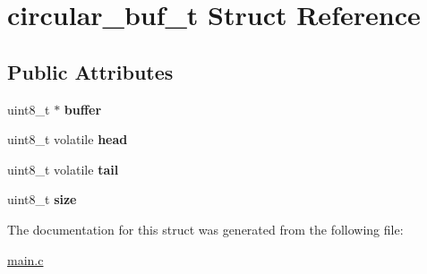 \hypertarget{structcircular__buf__t}{}\section{circular\+\_\+buf\+\_\+t Struct Reference}
\label{structcircular__buf__t}
\subsection*{Public Attributes}
\begin{DoxyCompactItemize}
\item 
\mbox{\label{structcircular__buf__t_a387a0285039db9b810e250ac1dfe2752}} 
uint8\+\_\+t $\ast$ {\bfseries buffer}
\item 
\mbox{\label{structcircular__buf__t_abc04c161857fbe8643267fb594905d05}} 
uint8\+\_\+t volatile {\bfseries head}
\item 
\mbox{\label{structcircular__buf__t_acffa380f81e445831597966241fdeeca}} 
uint8\+\_\+t volatile {\bfseries tail}
\item 
\mbox{\label{structcircular__buf__t_ab4d3cd8c24ecc9f79f6fed5d87ebbaa6}} 
uint8\+\_\+t {\bfseries size}
\end{DoxyCompactItemize}


The documentation for this struct was generated from the following file\+:\begin{DoxyCompactItemize}
\item 
\mbox{\hyperlink{main_8c}{main.\+c}}\end{DoxyCompactItemize}
